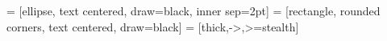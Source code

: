 \usepackage{gb4e}  %
\noautomath

\newcommand{\todocite}{\todo{citation!}}
\newcommand{\sortof}[1]{`#1'}
\newcommand{\lform}[1]{\texttt{#1}}
\newcommand{\graphedge}[1]{`#1'}
\newcommand{\graphnode}[1]{`#1'}
\newcommand{\word}[1]{``#1''}
\newcommand{\phrase}[1]{``#1''}
\newcommand{\sentence}[1]{``#1''}


 = [ellipse, text centered, draw=black, inner sep=2pt] %
 = [rectangle, rounded corners, text centered, draw=black] %
 = [thick,->,>=stealth]


\newcommand{\sources}{\ensuremath{\mathcal{S}}}
\newcommand{\tp}[1]{\ensuremath{\tau(#1)}}   %
\newcommand{\type}[1]{\ensuremath{[#1]}}

